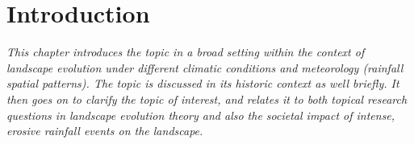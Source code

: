\chapter{Introduction}
\label{Intro}
\textit{This chapter introduces the topic in a broad setting within the context of landscape evolution under different climatic conditions and meteorology (rainfall spatial patterns). The topic is discussed in its historic context as well briefly. It then goes on to clarify the topic of interest, and relates it to both topical research questions in landscape evolution theory and also the societal impact of intense, erosive rainfall events on the landscape.}